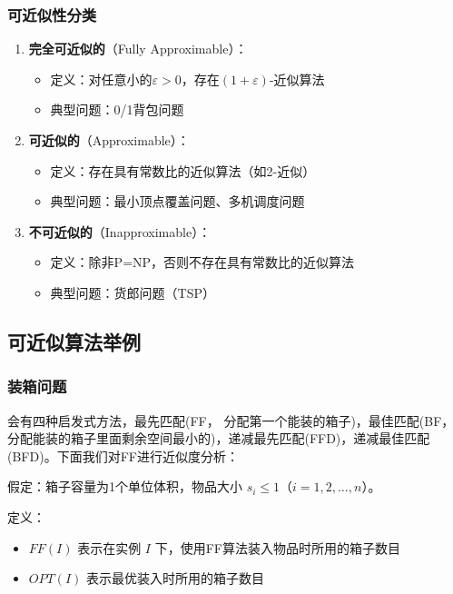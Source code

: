\documentclass[./../main.tex]{subfiles} %
\begin{document}
\subsubsection{可近似性分类}
\begin{enumerate}
    \item \textbf{完全可近似的}（Fully Approximable）：
    \begin{itemize}
        \item 定义：对任意小的$\varepsilon>0$，存在$(1 + \varepsilon)$-近似算法
        \item 典型问题：0/1背包问题
    \end{itemize}
    
    \item \textbf{可近似的}（Approximable）：
    \begin{itemize}
        \item 定义：存在具有常数比的近似算法（如2-近似）
        \item 典型问题：最小顶点覆盖问题、多机调度问题
    \end{itemize}
    
    \item \textbf{不可近似的}（Inapproximable）：
    \begin{itemize}
        \item 定义：除非P=NP，否则不存在具有常数比的近似算法
        \item 典型问题：货郎问题（TSP）
    \end{itemize}
\end{enumerate}

\subsection{可近似算法举例}
\subsubsection{装箱问题}
会有四种启发式方法，最先匹配(FF， 分配第一个能装的箱子)，最佳匹配(BF，分配能装的箱子里面剩余空间最小的)，递减最先匹配(FFD)，递减最佳匹配(BFD)。下面我们对FF进行近似度分析：

假定：箱子容量为1个单位体积，物品大小 $s_i \leq 1$（$i = 1,2,\dots,n$）。

定义：
\begin{itemize}
    \item $FF(I)$ 表示在实例 $I$ 下，使用FF算法装入物品时所用的箱子数目
    \item $OPT(I)$ 表示最优装入时所用的箱子数目
\end{itemize}
\end{document}
